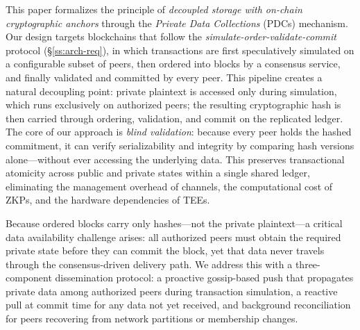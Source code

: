 This paper formalizes the principle of \textit{decoupled storage with on-chain cryptographic anchors} through the \textit{Private Data Collections} (PDCs) mechanism. Our design targets blockchains that follow the \textit{simulate-order-validate-commit} protocol (\S\ref{ss:arch-req}), in which transactions are first speculatively simulated on a configurable subset of peers, then ordered into blocks by a consensus service, and finally validated and committed by every peer. This pipeline creates a natural decoupling point: private plaintext is accessed only during simulation, which runs exclusively on authorized peers; the resulting cryptographic hash is then carried through ordering, validation, and commit on the replicated ledger. The core of our approach is \textit{blind validation}: because every peer holds the hashed commitment, it can verify serializability and integrity by comparing hash versions alone---without ever accessing the underlying data. This preserves transactional atomicity across public and private states within a single shared ledger, eliminating the management overhead of channels, the computational cost of ZKPs, and the hardware dependencies of TEEs.

Because ordered blocks carry only hashes---not the private plaintext---a critical data availability challenge arises: all authorized peers must obtain the required private state before they can commit the block, yet that data never travels through the consensus-driven delivery path. We address this with a three-component dissemination protocol: a proactive gossip-based push that propagates private data among authorized peers during transaction simulation, a reactive pull at commit time for any data not yet received, and background reconciliation for peers recovering from network partitions or membership changes.

